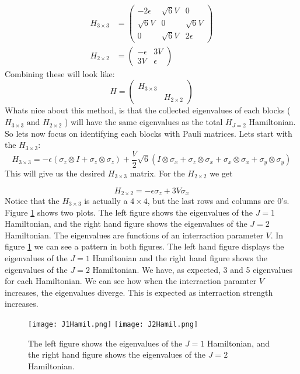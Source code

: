 \documentclass[11pt, letterpaper, titlepage]{article}
\begin{document}
\[
\begin{aligned}
H_{3 \times 3} &= 
\begin{pmatrix}
  -2ϵ & \sqrt{6}V & 0\\
  \sqrt{6}V & 0 & \sqrt{6}V\\
  0& \sqrt{6}V&2ϵ
\end{pmatrix} \\
H_{2 \times 2} &= 
\begin{pmatrix}
  -ϵ & 3V \\
  3V & ϵ
\end{pmatrix}
\end{aligned}
\]
Combining these will look like:
\[
H = 
\begin{pmatrix}
  H_{3× 3} & \\
  & H_{2× 2}
\end{pmatrix}
\]
Whats nice about this method, is that the collected eigenvalues of each blocks (\(H_{3\times 3} \text{ and } H_{2× 2} \) ) will have the same eigenvalues as the total \(H_{J=2}\) Hamiltonian. So lets now focus on identifying each blocks with Pauli matrices.\newline
Lets start with the \(H_{3\times 3}\):
\[
H_{3× 3} = -ϵ(σ_z⊗ I + σ_z \otimes σ_z) + \frac{V}{2} \sqrt{6} (I ⊗ σ_x + σ_z⊗ σ_x + σ_x⊗ σ_x +σ_y⊗ σ_y  ) 
\]
This will give us the desired \(H_{3\times 3}\) matrix. For the \(H_{2 \times 2}\) we get

\[
H_{2× 2} = -ϵ σ_z +3V σ_x
\]
Notice that the \(H_{3\times 3}\) is actually a \(4\times 4\), but the last rows and columns are \(0\)'s. \newline
Figure \ref{fig:PauliFigs} shows two plots. The left figure shows the eigenvalues of the \(J=1\) Hamiltonian, and the right hand figure shows the eigenvalues of the \(J=2\) Hamiltonian. The eigenvalues are functions of an interraction parameter \(V\). \newline
In figure \ref{fig:PauliFigs} we can see a pattern in both figures. The left hand figure displays the eigenvalues of the \(J=1\) Hamiltonian and the right hand figure shows the eigenvalues of the \(J=2\) Hamiltonian. We have, as expected, 3 and 5 eigenvalues for each Hamiltonian. We can see how when the interraction paramter \(V\) increases, the eigenvalues diverge. This is expected as interraction strength increases. 

\begin{figure}[h]
        \begin{center}
                \texttt{[image: J1Hamil.png]}
                \texttt{[image: J2Hamil.png]}       
        \end{center}
        \caption{The left figure shows the eigenvalues of the \(J=1\) Hamiltonian, and the right hand figure shows the eigenvalues of the \(J=2\) Hamiltonian.}
        \label{fig:PauliFigs}
\end{figure}\newpage
\end{document}
